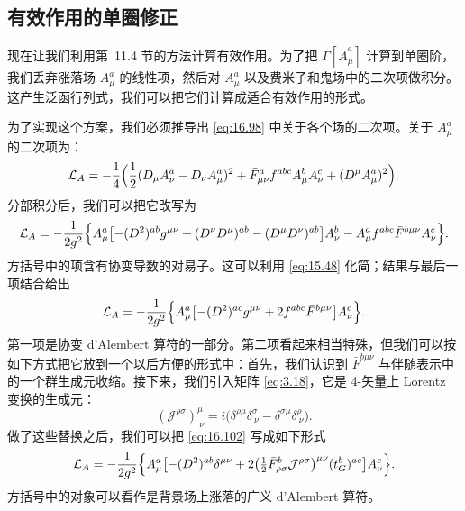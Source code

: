 \subsection{有效作用的单圈修正}

现在让我们利用第~11.4 节的方法计算有效作用。为了把 $\Gamma[\bar{A}^a_\mu]$ 计算到单圈阶，我们丢弃涨落场 $A^a_\mu$ 的线性项，然后对 $A^a_\mu$ 以及费米子和鬼场中的二次项做积分。这产生泛函行列式，我们可以把它们计算成适合有效作用的形式。

为了实现这个方案，我们必须推导出 \eqref{eq:16.98} 中关于各个场的二次项。关于 $A^a_\mu$ 的二次项为：
\begin{equation}
  \mathcal{L}_A = -\frac{1}{4}\Bigl( \frac{1}{2}(D_\mu A^a_\nu - D_\nu
    A^a_\mu)^2 + \bar{F}^a_{\mu\nu}f^{abc}A^b_\mu A^c_\nu + (D^\mu A^a_\mu)^2
    \Bigr) .
  \label{eq:16.100}
\end{equation}
分部积分后，我们可以把它改写为
\begin{equation}
  \mathcal{L}_A = -\frac{1}{2g^2}\Bigl\{ A^a_\mu\bigl[ -(D^2)^{ab}g^{\mu\nu}
    + (D^\nu D^\mu)^{ab} - (D^\mu D^\nu)^{ab} \bigr]A^b_\nu
    - A^a_\mu f^{abc}\bar{F}^{b\mu\nu}A^c_\nu \Bigr\} .
  \label{eq:16.101}
\end{equation}
方括号中的项含有协变导数的对易子。这可以利用 \eqref{eq:15.48} 化简；结果与最后一项结合给出
\begin{equation}
  \mathcal{L}_A = -\frac{1}{2g^2}\Bigl\{ A^a_\mu\bigl[ -(D^2)^{ac}g^{\mu\nu}
    + 2f^{abc}\bar{F}^{b\mu\nu} \bigr]A^c_\nu \Bigr\} .
  \label{eq:16.102}
\end{equation}
第一项是协变 d'Alembert 算符的一部分。第二项看起来相当特殊，但我们可以按如下方式把它放到一个以后方便的形式中：首先，我们认识到 $\bar{F}^{b\mu\nu}$ 与伴随表示中的一个群生成元收缩。接下来，我们引入矩阵 \eqref{eq:3.18}，它是 4-矢量上 Lorentz 变换的生成元：
\begin{equation}
  (\mathcal{J}^{\rho\sigma})^\mu_{\ \nu} = i\bigl( \delta^{\rho\mu}
    \delta^{\sigma}_{\ \nu} - \delta^{\sigma\mu}\delta^{\rho}_{\ \nu}
    \bigr) .
  \label{eq:16.103}
\end{equation}
做了这些替换之后，我们可以把 \eqref{eq:16.102} 写成如下形式
\begin{equation}
  \mathcal{L}_A = -\frac{1}{2g^2}\Bigl\{ A^a_\mu\bigl[ -(D^2)^{ab}
    \delta^{\mu\nu} + 2\bigl( \tfrac{1}{2}\bar{F}^{b}_{\rho\sigma}
      \mathcal{J}^{\rho\sigma} \bigr)^{\mu\nu}(t^b_G)^{ac} \bigr]A^c_\nu
    \Bigr\} .
  \label{eq:16.104}
\end{equation}
方括号中的对象可以看作是背景场上涨落的广义 d'Alembert 算符。


